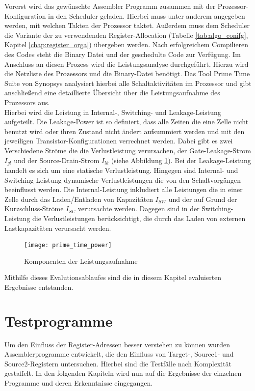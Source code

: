 Vorerst wird das gewünschte Assembler Programm zusammen mit der Prozessor-Konfiguration in den Scheduler geladen. Hierbei muss unter anderem angegeben werden, mit welchen Takten der Prozessor taktet. Außerdem muss dem Scheduler die Variante der zu verwendenden Register-Allocation (Tabelle \ref{tab:algo_conifg}, Kapitel \ref{chap:register_orga}) übergeben werden. Nach erfolgreichem Compilieren des Codes steht die Binary Datei und der geschedulte Code zur Verfügung. Im Anschluss an diesen Prozess wird die Leistungsanalyse durchgeführt. Hierzu wird die Netzliste des Prozessors und die Binary-Datei benötigt. Das Tool \glqq Prime Time Suite\grqq{ } von Synopsys analysiert hierbei alle Schaltaktivitäten im Prozessor und gibt anschließend eine detaillierte Übersicht über die Leistungsaufnahme des Prozessors aus.\\
Hierbei wird die Leistung in Internal-, Switching- und Leakage-Leistung aufgeteilt. Die Leakage-Power ist so definiert, dass alle Zeiten die eine Zelle nicht benutzt wird oder ihren Zustand nicht ändert aufsummiert werden und mit den jeweiligen Transistor-Konfigurationen verrechnet werden. Dabei gibt es zwei Verschiedene Ströme die die Verlustleistung verursachen, der Gate-Leakage-Strom $I_{gl}$ und der Source-Drain-Strom $I_{lk}$ (siehe Abbildung \ref{fig:prime_time_power}).  Bei der Leakage-Leistung handelt es sich um eine statische Verlustleistung. Hingegen sind Internal- und Switching-Leistung dynamische Verlustleistungen die von den Schaltvorgängen beeinflusst werden. Die Internal-Leistung inkludiert alle Leistungen die in einer Zelle durch das Laden/Entladen von Kapazitäten $I_{SW}$ und der auf Grund der Kurzschluss-Ströme $I_{SC}$ verursachte werden. Dagegen sind in der Switching-Leistung die Verlustleistungen berücksichtigt, die durch das Laden von externen Lastkapazitäten verursacht werden.\cite{primeTime2016}
\begin{figure}[H] 
	\centering
	\texttt{[image: prime\_time\_power]}
	\caption[Komponenten der Leistungsaufnahme]{Komponenten der Leistungsaufnahme \cite{primeTime2016}}
	\label{fig:prime_time_power}
\end{figure}
Mithilfe dieses Evalutionsablaufes sind die in diesem Kapitel evaluierten Ergebnisse entstanden.
\section{Testprogramme}
Um den Einfluss der Register-Adressen besser verstehen zu können wurden Assemblerprogramme entwickelt, die den Einfluss von Target-, Source1- und Source2-Registern untersuchen. Hierbei sind die Testfälle nach Komplexität gestaffelt. In den folgenden Kapiteln wird nun auf die Ergebnisse der einzelnen Programme und deren Erkenntnisse eingegangen.
